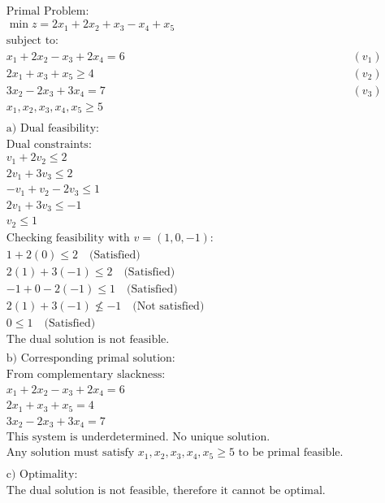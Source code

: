 \documentclass{article}
\begin{document}
$\begin{aligned}
& \text{Primal Problem:} \\
& \min z = 2x_1 + 2x_2 + x_3 - x_4 + x_5 \\
& \text{subject to:} \\
& x_1 + 2x_2 - x_3 + 2x_4 = 6 & (v_1) \\
& 2x_1 + x_3 + x_5 \geq 4 & (v_2) \\
& 3x_2 - 2x_3 + 3x_4 = 7 & (v_3) \\
& x_1, x_2, x_3, x_4, x_5 \geq 5 \\
& \\
& \text{a) Dual feasibility:} \\
& \text{Dual constraints:} \\
& v_1 + 2v_2 \leq 2 \\
& 2v_1 + 3v_3 \leq 2 \\
& -v_1 + v_2 - 2v_3 \leq 1 \\
& 2v_1 + 3v_3 \leq -1 \\
& v_2 \leq 1 \\
& \text{Checking feasibility with } v = (1, 0, -1): \\
& 1 + 2(0) \leq 2 \quad \text{(Satisfied)} \\
& 2(1) + 3(-1) \leq 2 \quad \text{(Satisfied)} \\
& -1 + 0 - 2(-1) \leq 1 \quad \text{(Satisfied)} \\
& 2(1) + 3(-1) \not\leq -1 \quad \text{(Not satisfied)} \\
& 0 \leq 1 \quad \text{(Satisfied)} \\
& \text{The dual solution is not feasible.} \\
& \\
& \text{b) Corresponding primal solution:} \\
& \text{From complementary slackness:} \\
& x_1 + 2x_2 - x_3 + 2x_4 = 6 \\
& 2x_1 + x_3 + x_5 = 4 \\
& 3x_2 - 2x_3 + 3x_4 = 7 \\
& \text{This system is underdetermined. No unique solution.} \\
& \text{Any solution must satisfy } x_1, x_2, x_3, x_4, x_5 \geq 5 \text{ to be primal feasible.} \\
& \\
& \text{c) Optimality:} \\
& \text{The dual solution is not feasible, therefore it cannot be optimal.}
\end{aligned}$
\end{document}
